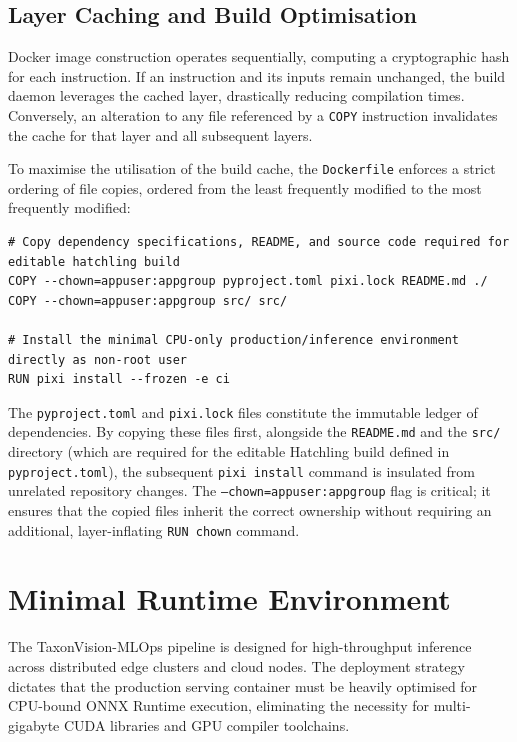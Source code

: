 \subsection{Layer Caching and Build Optimisation}

Docker image construction operates sequentially, computing a cryptographic hash for each instruction. If an instruction and its inputs remain unchanged, the build daemon leverages the cached layer, drastically reducing compilation times. Conversely, an alteration to any file referenced by a \texttt{COPY} instruction invalidates the cache for that layer and all subsequent layers.

To maximise the utilisation of the build cache, the \texttt{Dockerfile} enforces a strict ordering of file copies, ordered from the least frequently modified to the most frequently modified:

\begin{verbatim}
# Copy dependency specifications, README, and source code required for editable hatchling build
COPY --chown=appuser:appgroup pyproject.toml pixi.lock README.md ./
COPY --chown=appuser:appgroup src/ src/

# Install the minimal CPU-only production/inference environment directly as non-root user
RUN pixi install --frozen -e ci
\end{verbatim}

The \texttt{pyproject.toml} and \texttt{pixi.lock} files constitute the immutable ledger of dependencies. By copying these files first, alongside the \texttt{README.md} and the \texttt{src/} directory (which are required for the editable Hatchling build defined in \texttt{pyproject.toml}), the subsequent \texttt{pixi install} command is insulated from unrelated repository changes. The \texttt{--chown=appuser:appgroup} flag is critical; it ensures that the copied files inherit the correct ownership without requiring an additional, layer-inflating \texttt{RUN chown} command.

\section{Minimal Runtime Environment}
\label{sec:minimal_runtime_environment}

The TaxonVision-MLOps pipeline is designed for high-throughput inference across distributed edge clusters and cloud nodes. The deployment strategy dictates that the production serving container must be heavily optimised for CPU-bound ONNX Runtime execution, eliminating the necessity for multi-gigabyte CUDA libraries and GPU compiler toolchains.

